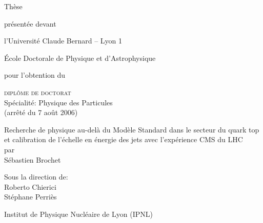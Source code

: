 \begin{titlepage}
\vspace*{-2cm}
\begin{center}
{\Large Thèse\\}

\vspace{0.5em}

{\small présentée devant\\}

\vspace{0.5em}

{\large l'Université Claude Bernard -- Lyon 1\\

\vspace{0.2em}

École Doctorale de Physique et d'Astrophysique\\}

\vspace{2.5em}

pour l'obtention du \\

\vspace{1.5em}

{\Large \textsc{diplôme de doctorat}\\
\small Spécialité: Physique des Particules \\
(arrêté du 7 août 2006)}

\end{center}

\vspace{0.8em}

\begin{center} \LARGE
Recherche de physique au-delà du Modèle Standard dans le secteur du quark top et calibration de l'échelle en énergie des jets avec l'expérience CMS du LHC\\
\vspace{0.8em}
\small par\\
\Large Sébastien Brochet
\end{center}

\vspace{1em}

\begin{center}
\large
Sous la direction de:\\
Roberto Chierici\\
Stéphane Perriès
\end{center}

\begin{center}
\large Institut de Physique Nucléaire de Lyon (IPNL)
\end{center}


\end{titlepage}
